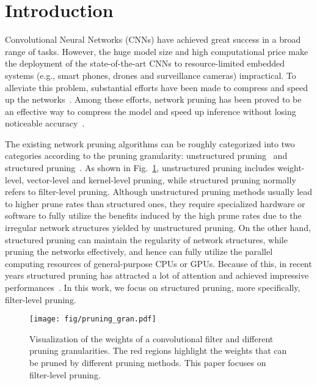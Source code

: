 \documentclass[runningheads, envcountsame, a4paper]{llncs}
\begin{document}
\section{Introduction} 
Convolutional Neural Networks (CNNs) have achieved great success in a broad range of tasks. However, the huge model size and high computational price make the deployment of the state-of-the-art CNNs to resource-limited embedded systems (e.g., smart phones, drones and surveillance cameras) impractical. To alleviate this problem, substantial efforts have been made to compress and speed up the networks~\cite{model_compression}. Among these efforts, network pruning has been proved to be an effective way to compress the model and speed up inference without losing noticeable accuracy~\cite{lecun1990optimal,han2015learning,wen2016ssl,louizos2017learning,li2019l_0,you2019gate,gsm19,park2020lookahead}.

The existing network pruning algorithms can be roughly categorized into two categories according to the pruning granularity: unstructured pruning~\cite{lecun1990optimal,han2015learning,gsm19,park2020lookahead} and structured pruning~\cite{li2016pruning,wen2016ssl,liu2017learning,zhuang2018discrimination,ding2019approximated,you2019gate,lin2020hrank}. As shown in Fig.~\ref{fig:gran}, unstructured pruning includes weight-level, vector-level and kernel-level pruning, while structured pruning normally refers to filter-level pruning. Although unstructured pruning methods usually lead to higher prune rates than structured ones, they require specialized hardware or software to fully utilize the benefits induced by the high prune rates due to the irregular network structures yielded by unstructured pruning. On the other hand, structured pruning can maintain the regularity of network structures, while pruning the networks effectively, and hence can fully utilize the parallel computing resources of general-purpose CPUs or GPUs. Because of this, in recent years structured pruning has attracted a lot of attention and achieved impressive performances~\cite{liu2017learning,zhuang2018discrimination,ding2019approximated,lin2020hrank}. In this work, we focus on structured pruning, more specifically, filter-level pruning. 

\begin{figure}[ht]
  \begin{center}
    \texttt{[image: fig/pruning\_gran.pdf]}
  \end{center} \vspace{-20pt}
  \caption{Visualization of the weights of a convolutional filter and different pruning granularities. The red regions highlight the weights that can be pruned by different pruning methods. This paper focuses on filter-level pruning.}\label{fig:gran}
\end{figure}
\end{document}
